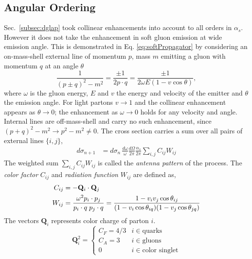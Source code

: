 \subsection{Angular Ordering}
\label{sec:angularOrdering}
Sec.~\ref{subsec:dglap} took collinear enhancements into account to all orders in
\(\alpha_s\). However it does not take the enhancement in soft gluon emission at wide emission angle. 
This is demonstrated in Eq. \ref{eq:softPropagator} by considering an on-mass-shell external line of
momentum \(p\), mass \(m\) emitting a gluon with momentum \(q\)  at an angle \(\theta\)
\begin{equation}
	\frac{1}{(p\pm q)^2 - m^2} = \frac{\pm1}{2p\cdot q}
	= \frac{\pm1}{2\omega E(1-v\cos\theta)},
	\label{eq:softPropagator}
\end{equation}
where \(\omega\) is the gluon energy, \(E\) and \(v\) the energy and velocity of the
emitter and \(\theta\) the emission angle. For light partons \(v\to1\) and the
collinear enhancement appears as \(\theta\to0\); the enhancement as \(\omega\to0\)
holds for any velocity and angle. Internal lines  are off-mass-shell and carry no such enhancement, since
\((p+q)^2-m^2\to p^2-m^2\neq0\). The cross section carries a sum over all pairs of external lines \(\{i,j\}\),
\begin{align}
	\label{eq:antennaSplitXSec}
	d\sigma_{n+1}& = d\sigma_n\,\frac{d\omega}{\omega}\frac{d\Omega}{2\pi}
	\frac{\alpha_s}{2\pi}\sum_{i,j}C_{ij}W_{ij}
\end{align}
The weighted sum \(\sum_{i,j}C_{ij}W_{ij}\)  is called the \emph{antenna pattern} of the process. The \emph{color factor} \(C_{ij}\) and \emph{radiation function} \(W_{ij}\)  are defined as,
\begin{align}
	C_{ij} &= -\mathbf{Q}_i\cdot\mathbf{Q}_j  \notag \\
	W_{ij} &= \frac{\omega^2 p_i\cdot p_j}{p_i\cdot q\;p_j\cdot q}
	= \frac{1-v_iv_j\cos\theta_{ij}}
	{(1-v_i\cos\theta_{iq})(1-v_j\cos\theta_{jq})}
\end{align}
  The vectors \(\mathbf{Q}_{i}\) represents color charge of parton \(i\). 
  \begin{equation}
  	\mathbf{Q}_i^2 = 
  	\begin{cases}
  		C_F = 4/3 & i \in \text{quarks} \\[-15pt]
  		C_A = 3 & i \in \text{gluons}\\[-15pt]
  		0 & i \in \text{color singlet}
  	\end{cases}
  \end{equation}
  
